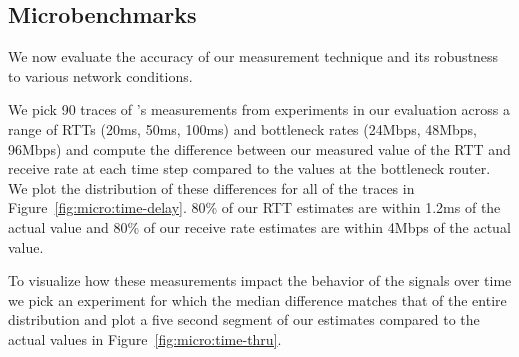 \subsection{Microbenchmarks}
\label{s:measure:microbench}
    We now evaluate the accuracy of our measurement technique and its robustness to various network conditions. 

    We pick 90 traces of \name's measurements from experiments in our evaluation across a range of RTTs (20ms, 50ms, 100ms) and bottleneck rates (24Mbps, 48Mbps, 96Mbps) and compute the difference between our measured value of the RTT and receive rate at each time step compared to the values at the bottleneck router. We plot the distribution of these differences for all of the traces in Figure~\ref{fig:micro:time-delay}. 80\% of our RTT estimates are within 1.2ms of the actual value and 80\% of our receive rate estimates are within 4Mbps of the actual value. 
    
    To visualize how these measurements impact the behavior of the signals over time we pick an experiment for which the median difference matches that of the entire distribution and plot a five second segment of our estimates compared to the actual values in Figure~\ref{fig:micro:time-thru}.
